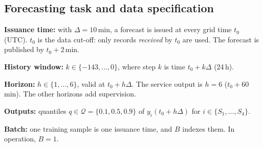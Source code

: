 \documentclass[11pt,a4paper]{article}
\begin{document}
\subsection{Forecasting task and data specification}\label{sec:task}
\textbf{Issuance time:} with $\Delta=10$\,min, a forecast is issued at every
grid time $t_0$ (UTC). $t_0$ is the data cut-off: only records \emph{received}
by $t_0$ are used. The forecast is published by $t_0+2$\,min.

\textbf{History window:} $k\in\{-143,\dots,0\}$, where step $k$ is time
$t_0+k\Delta$ (24\,h).

\textbf{Horizon:} $h\in\{1,\dots,6\}$, valid at $t_0+h\Delta$. The service
output is $h=6$ ($t_0+60$\,min). The other horizons add supervision.

\textbf{Outputs:} quantiles $q\in\mathcal{Q}=\{0.1,0.5,0.9\}$ of
$y_i(t_0+h\Delta)$ for $i\in\{S_1,\dots,S_4\}$.

\textbf{Batch:} one training sample is one issuance time, and $B$ indexes
them. In operation, $B=1$.
\end{document}
